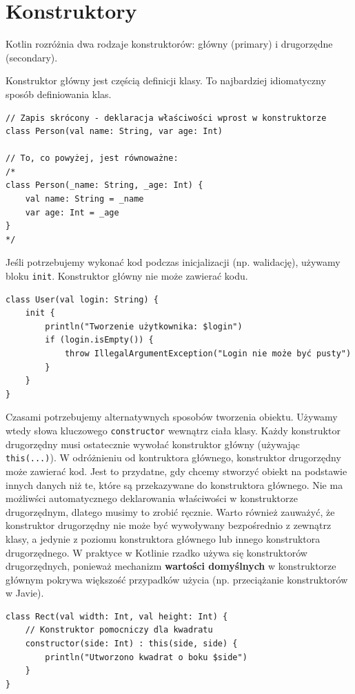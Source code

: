 \section{Konstruktory}

Kotlin rozróżnia dwa rodzaje konstruktorów: główny (primary) i drugorzędne (secondary).

Konstruktor główny jest częścią definicji klasy. To najbardziej idiomatyczny sposób definiowania klas.

\begin{verbatim}
// Zapis skrócony - deklaracja właściwości wprost w konstruktorze
class Person(val name: String, var age: Int)

// To, co powyżej, jest równoważne:
/*
class Person(_name: String, _age: Int) {
    val name: String = _name
    var age: Int = _age
}
*/
\end{verbatim}

Jeśli potrzebujemy wykonać kod podczas inicjalizacji (np. walidację), używamy bloku \texttt{init}. Konstruktor główny nie może zawierać kodu.

\begin{verbatim}
class User(val login: String) {
    init {
        println("Tworzenie użytkownika: $login")
        if (login.isEmpty()) {
            throw IllegalArgumentException("Login nie może być pusty")
        }
    }
}
\end{verbatim}

Czasami potrzebujemy alternatywnych sposobów tworzenia obiektu. Używamy wtedy słowa kluczowego \texttt{constructor} wewnątrz ciała klasy. Każdy konstruktor drugorzędny musi ostatecznie wywołać konstruktor główny (używając \texttt{this(...)}). W odróżnieniu od kontruktora głównego, konstruktor drugorzędny może zawierać kod. Jest to przydatne, gdy chcemy stworzyć obiekt na podstawie innych danych niż te, które są przekazywane do konstruktora głównego. Nie ma możliwści automatycznego deklarowania właściwości w konstruktorze drugorzędnym, dlatego musimy to zrobić ręcznie. Warto również zauważyć, że konstruktor drugorzędny nie może być wywoływany bezpośrednio z zewnątrz klasy, a jedynie z poziomu konstruktora głównego lub innego konstruktora drugorzędnego. W praktyce w Kotlinie rzadko używa się konstruktorów drugorzędnych, ponieważ mechanizm \textbf{wartości domyślnych} w konstruktorze głównym pokrywa większość przypadków użycia (np. przeciążanie konstruktorów w Javie).

\begin{verbatim}
class Rect(val width: Int, val height: Int) {
    // Konstruktor pomocniczy dla kwadratu
    constructor(side: Int) : this(side, side) {
        println("Utworzono kwadrat o boku $side")
    }
}
\end{verbatim}

